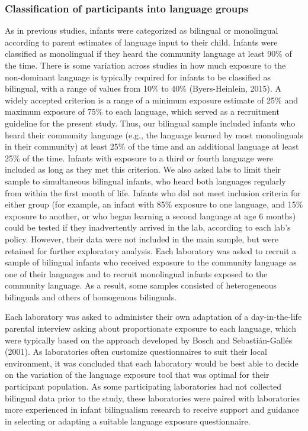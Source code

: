 \documentclass[english,,man,floatsintext]{apa6}
\begin{document}
\hypertarget{classification-of-participants-into-language-groups}{%
\subsubsection{Classification of participants into language groups}\label{classification-of-participants-into-language-groups}}

As in previous studies, infants were categorized as bilingual or monolingual according to parent estimates of language input to their child. Infants were classified as monolingual if they heard the community language at least 90\% of the time. There is some variation across studies in how much exposure to the non-dominant language is typically required for infants to be classified as bilingual, with a range of values from 10\% to 40\% (Byers-Heinlein, 2015). A widely accepted criterion is a range of a minimum exposure estimate of 25\% and maximum exposure of 75\% to each language, which served as a recruitment guideline for the present study. Thus, our bilingual sample included infants who heard their community language (e.g., the language learned by most monolinguals in their community) at least 25\% of the time and an additional language at least 25\% of the time. Infants with exposure to a third or fourth language were included as long as they met this criterion. We also asked labs to limit their sample to simultaneous bilingual infants, who heard both languages regularly from within the first month of life. Infants who did not meet inclusion criteria for either group (for example, an infant with 85\% exposure to one language, and 15\% exposure to another, or who began learning a second language at age 6 months) could be tested if they inadvertently arrived in the lab, according to each lab's policy. However, their data were not included in the main sample, but were retained for further exploratory analysis. Each laboratory was asked to recruit a sample of bilingual infants who received exposure to the community language as one of their languages and to recruit monolingual infants exposed to the community language. As a result, some samples consisted of heterogeneous bilinguals and others of homogenous bilinguals.

Each laboratory was asked to administer their own adaptation of a day-in-the-life parental interview asking about proportionate exposure to each language, which were typically based on the approach developed by Bosch and Sebastián-Gallés (2001). As laboratories often customize questionnaires to suit their local environment, it was concluded that each laboratory would be best able to decide on the variation of the language exposure tool that was optimal for their participant population. As some participating laboratories had not collected bilingual data prior to the study, these laboratories were paired with laboratories more experienced in infant bilingualism research to receive support and guidance in selecting or adapting a suitable language exposure questionnaire.
\end{document}
